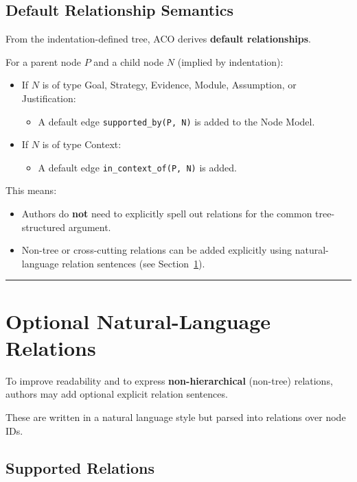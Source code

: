 \documentclass[11pt]{article}
\begin{document}
\subsection{Default Relationship Semantics}

From the indentation-defined tree, ACO derives \textbf{default relationships}.

For a parent node \(P\) and a child node \(N\) (implied by indentation):
\begin{itemize}[leftmargin=2em]
  \item If \(N\) is of type Goal, Strategy, Evidence, Module, Assumption, or Justification:
  \begin{itemize}[leftmargin=1.5em]
    \item A default edge \texttt{supported\_by(P, N)} is added to the Node Model.
  \end{itemize}

  \item If \(N\) is of type Context:
  \begin{itemize}[leftmargin=1.5em]
    \item A default edge \texttt{in\_context\_of(P, N)} is added.
  \end{itemize}
\end{itemize}

This means:
\begin{itemize}[leftmargin=2em]
  \item Authors do \textbf{not} need to explicitly spell out relations for the common tree-structured argument.
  \item Non-tree or cross-cutting relations can be added explicitly using natural-language relation sentences (see Section~\ref{sec:nl-relations}).
\end{itemize}

\bigskip
\hrule
\bigskip

\section{Optional Natural-Language Relations}
\label{sec:nl-relations}

To improve readability and to express \textbf{non-hierarchical} (non-tree) relations, authors may add optional explicit relation sentences.

These are written in a natural language style but parsed into relations over node IDs.

\subsection{Supported Relations}
\end{document}
